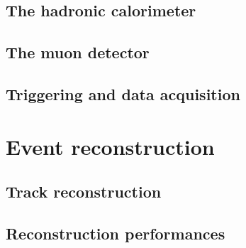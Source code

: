 \subsection{The hadronic calorimeter} 
\subsection{The muon detector} 
\subsection{Triggering and data acquisition} 
\section{Event reconstruction}\label{sec:reconstruction}
\subsection{Track reconstruction} 
\subsection{Reconstruction performances}
\clearpage
